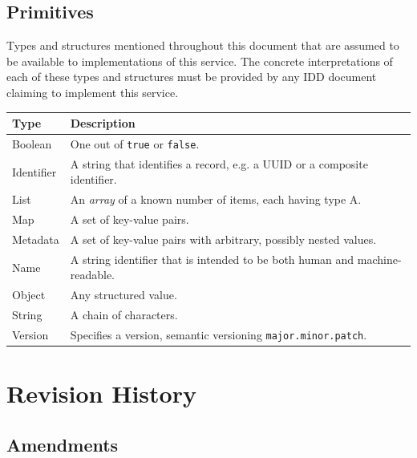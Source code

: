 \documentclass[a4paper]{arrowhead}
\newcommand{\pdef}[1]{{\textcolor{ArrowheadGrey}{#1\label{sec:model:primitives:#1}\label{sec:model:primitives:#1s}\label{sec:model:primitives:#1es}}}}
\begin{document}
\subsection{Primitives}
\label{sec:model:primitives}

Types and structures mentioned throughout this document that are assumed to be available to implementations of this service.
The concrete interpretations of each of these types and structures must be provided by any IDD document claiming to implement this service.

\noindent\begin{tabularx}{\textwidth}{| p{4.6cm} | X |} \hline
\rowcolor{gray!33} Type & Description \\ \hline
\pdef{Boolean} & One out of \texttt{true} or \texttt{false}. \\ \hline
\pdef{Identifier} & A string that identifies a record, e.g. a UUID or a composite identifier. \\ \hline
\pdef{List} & An \textit{array} of a known number of items, each having type A. \\ \hline
\pdef{Map} & A set of key-value pairs. \\ \hline
\pdef{Metadata} & A set of key-value pairs with arbitrary, possibly nested values. \\ \hline
\pdef{Name} & A string identifier that is intended to be both human and machine-readable. \\ \hline
\pdef{Object} & Any structured value. \\ \hline
\pdef{String} & A chain of characters. \\ \hline
\pdef{Version} & Specifies a version, semantic versioning \texttt{major.minor.patch}. \\ \hline
\end{tabularx}

\newpage




\newpage

\section{Revision History}
\subsection{Amendments}
\end{document}
